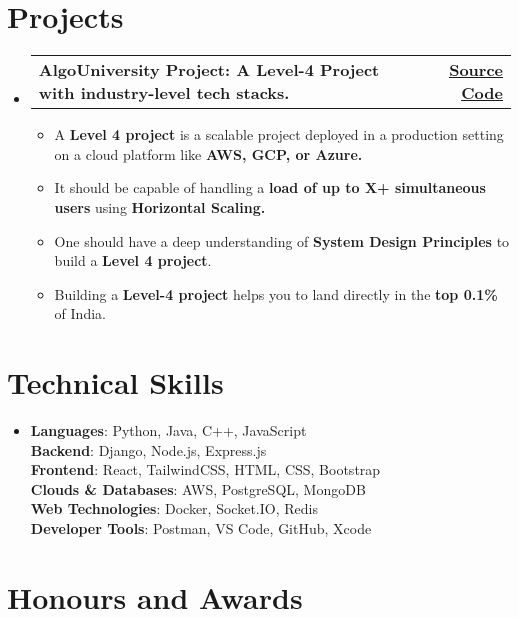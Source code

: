 \documentclass[letterpaper,11pt]{article}
\makeatletter
\newcommand{\resumeItem}[1]{
  \item\small{
    {#1 \vspace{-2pt}}
  }
}
\newcommand{\resumeProjectHeading}[2]{
    \item
    \begin{tabular*}{1.001\textwidth}{l@{\extracolsep{\fill}}r}
      \small#1 & \textbf{\small #2}\\
    \end{tabular*}\vspace{-7pt}
}
\newcommand{\resumeSubHeadingListStart}{\begin{itemize}[leftmargin=0.0in, label={}]}
\newcommand{\resumeSubHeadingListEnd}{\end{itemize}}
\newcommand{\resumeItemListStart}{\begin{itemize}}
\newcommand{\resumeItemListEnd}{\end{itemize}\vspace{-5pt}}
\makeatother
\begin{document}
\section{Projects}
\vspace{-5pt}
\resumeSubHeadingListStart
\resumeProjectHeading{\textbf{AlgoUniversity Project: A Level-4 Project with industry-level tech stacks.}}{\href{https://bit.ly/accelerator-2023}{\underline{Source Code}}}
\resumeItemListStart
\resumeItem{A \textbf{Level 4 project} is a scalable project deployed in a production setting on a cloud platform like \textbf{AWS, GCP, or Azure.}}
\resumeItem{It should be capable of handling a \textbf{load of up to X+ simultaneous users} using \textbf{Horizontal Scaling.}}
\resumeItem{One should have a deep understanding of \textbf{System Design Principles} to build a \textbf{Level 4 project}.}
\resumeItem{Building a \textbf{Level-4 project} helps you to land directly in the \textbf{top 0.1\%} of India.}
\resumeItemListEnd
\vspace{-13pt}

\resumeSubHeadingListEnd
\vspace{-3pt}


%
\section{Technical Skills}
\begin{itemize}[leftmargin=0.15in, label={}]
  \item{
        \textbf{Languages}{: Python, Java, C++, JavaScript} \\
        \textbf{Backend}{: Django, Node.js, Express.js}\\
        \textbf{Frontend}{: React, TailwindCSS, HTML, CSS, Bootstrap} \\
        \textbf{Clouds \& Databases}{: AWS, PostgreSQL, MongoDB} \\
        \textbf{Web Technologies}{: Docker, Socket.IO, Redis} \\
        \textbf{Developer Tools}{: Postman, VS Code, GitHub, Xcode} \\

        }
\end{itemize}
\vspace{-15pt}

\section{Honours and Awards}
\end{document}
